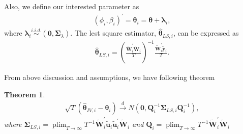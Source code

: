 \documentclass[12pt,a4paper,hyperref]{article}
\newtheorem{myTheo}{Theorem}
\DeclareMathOperator*{\plim}{plim}
\begin{document}
Also, we define our interested parameter as
\begin{align}
\left(\phi_{i},\beta_{i}  \right)^{'}=\boldsymbol{\theta}_{i}=\boldsymbol{\theta}+\boldsymbol{\lambda}_{i},
\end{align}
where $\boldsymbol{\lambda}_{i}\overset{i.i.d.}{\sim} \left(\boldsymbol{0}, \boldsymbol{\Sigma}_{\lambda} \right).$
The lest square estimator, $\hat{\boldsymbol{\theta}}_{LS,i}$, can be expressed as
\begin{align}
\hat{\boldsymbol{\theta}}_{LS,i}=\left(\frac{\tilde{\boldsymbol{W}}^{'}_{i} \tilde{\boldsymbol{W}}_{i}}{T}  \right)^{-1} \frac{ \tilde{\boldsymbol{W}}^{'}_{i}\tilde{\boldsymbol{y}}_{i}}{T}. \label{13}
\end{align}

From above discussion and assumptions, we have following theorem \\
\begin{myTheo}
\begin{align}
\sqrt{T}\left(\hat{\boldsymbol{\theta}}_{IV,i}-\boldsymbol{\theta}_{i}\right) \overset{d}{\to} N \left(\boldsymbol{0}, \boldsymbol{Q}_{i}^{-1}\boldsymbol{\Sigma}_{LS,i}\boldsymbol{Q}_{i}^{-1}  \right),
\end{align}
where $\boldsymbol{\Sigma}_{LS,i}=\plim_{T \to \infty} T^{-1}\tilde{\boldsymbol{W}}^{'}_{i} \tilde{\boldsymbol{u}}_{i} \tilde{\boldsymbol{u}}^{'}_{i}  \tilde{\boldsymbol{W}}_{i} $ and $\boldsymbol{Q}_{i}=\plim_{T \to \infty} T^{-1}\tilde{\boldsymbol{W}}^{'}_{i}\tilde{\boldsymbol{W}}_{i}$
\end{myTheo}
\end{document}
